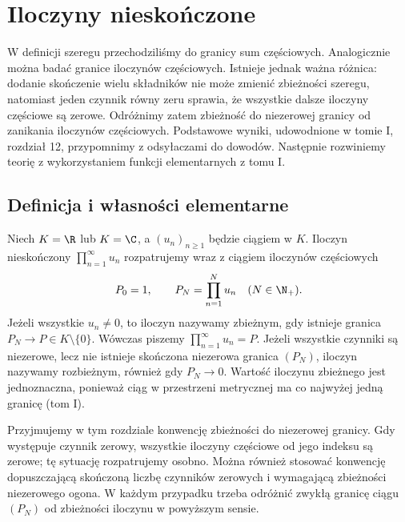 \chapter{Iloczyny nieskończone}
\label{ma1:ch:infinite-products}

W definicji szeregu przechodziliśmy do granicy sum częściowych. Analogicznie można badać granice iloczynów częściowych. Istnieje jednak ważna różnica: dodanie skończenie wielu składników nie może zmienić zbieżności szeregu, natomiast jeden czynnik równy zeru sprawia, że wszystkie dalsze iloczyny częściowe są zerowe. Odróżnimy zatem zbieżność do niezerowej granicy od zanikania iloczynów częściowych. Podstawowe wyniki, udowodnione w tomie I, rozdział 12, przypomnimy z odsyłaczami do dowodów. Następnie rozwiniemy teorię z wykorzystaniem funkcji elementarnych z tomu I.

\section{Definicja i własności elementarne}
\begin{definicja}
\label{ma1:def:infinite-product}
Niech $K=\R$ lub $K=\C$, a $(u_n)_{n\ge1}$ będzie ciągiem w $K$. Iloczyn nieskończony $\prod_{n=1}^\infty u_n$ rozpatrujemy wraz z ciągiem iloczynów częściowych
\[
 P_0=1,\qquad P_N=\prod_{n=1}^N u_n\quad(N\in\N_+).
\]
Jeżeli wszystkie $u_n\ne0$, to iloczyn nazywamy zbieżnym, gdy istnieje granica $P_N\to P\in K\setminus\{0\}$. Wówczas piszemy $\prod_{n=1}^\infty u_n=P$. Jeżeli wszystkie czynniki są niezerowe, lecz nie istnieje skończona niezerowa granica $(P_N)$, iloczyn nazywamy rozbieżnym, również gdy $P_N\to0$. Wartość iloczynu zbieżnego jest jednoznaczna, ponieważ ciąg w przestrzeni metrycznej ma co najwyżej jedną granicę (tom I).
\end{definicja}
Przyjmujemy w tym rozdziale konwencję zbieżności do niezerowej granicy. Gdy występuje czynnik zerowy, wszystkie iloczyny częściowe od jego indeksu są zerowe; tę sytuację rozpatrujemy osobno. Można również stosować konwencję dopuszczającą skończoną liczbę czynników zerowych i wymagającą zbieżności niezerowego ogona. W każdym przypadku trzeba odróżnić zwykłą granicę ciągu $(P_N)$ od zbieżności iloczynu w powyższym sensie.

